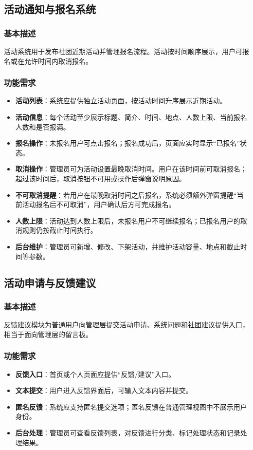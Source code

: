 \documentclass[a4paper,12pt]{article}
\begin{document}
\subsection{活动通知与报名系统}

\subsubsection{基本描述}
活动系统用于发布社团近期活动并管理报名流程。活动按时间顺序展示，用户可报名或在允许时间内取消报名。

\subsubsection{功能需求}
\begin{itemize}
    \item \textbf{活动列表}：系统应提供独立活动页面，按活动时间升序展示近期活动。
    \item \textbf{活动信息}：每个活动至少展示标题、简介、时间、地点、人数上限、当前报名人数和是否报满。
    \item \textbf{报名操作}：未报名用户可点击报名；报名成功后，页面应实时显示“已报名”状态。
    \item \textbf{取消操作}：管理员可为活动设置最晚取消时间。用户在该时间前可取消报名；超过该时间后，取消按钮不可用或操作后弹窗说明原因。
    \item \textbf{不可取消提醒}：若用户在最晚取消时间之后报名，系统必须额外弹窗提醒“当前活动报名后不可取消”，用户确认后方可完成报名。
    \item \textbf{人数上限}：活动达到人数上限后，未报名用户不可继续报名；已报名用户的取消规则仍按截止时间执行。
    \item \textbf{后台维护}：管理员可新增、修改、下架活动，并维护活动容量、地点和截止时间等参数。
\end{itemize}

\subsection{活动申请与反馈建议}

\subsubsection{基本描述}
反馈建议模块为普通用户向管理层提交活动申请、系统问题和社团建议提供入口，相当于面向管理层的留言板。

\subsubsection{功能需求}
\begin{itemize}
    \item \textbf{反馈入口}：首页或个人页面应提供“反馈/建议”入口。
    \item \textbf{文本提交}：用户进入反馈界面后，可输入文本内容并提交。
    \item \textbf{匿名反馈}：系统应支持匿名提交选项；匿名反馈在普通管理视图中不展示用户身份。
    \item \textbf{后台处理}：管理员可查看反馈列表，对反馈进行分类、标记处理状态和记录处理结果。
\end{itemize}
\end{document}
